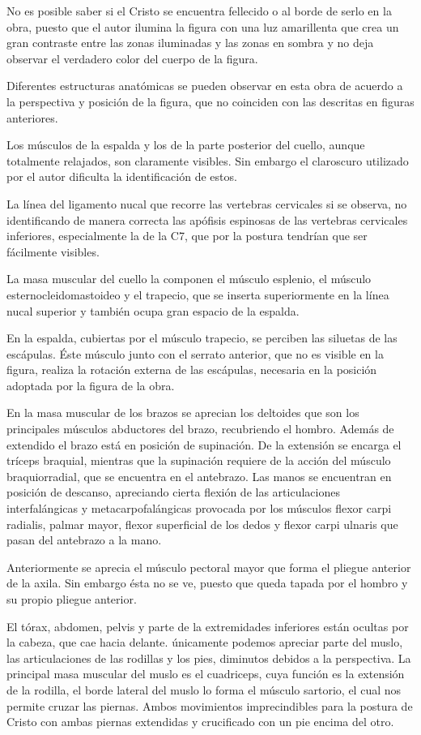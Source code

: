 No es posible saber si el Cristo se encuentra fellecido o al borde de serlo en la obra, puesto que el autor ilumina la figura con una luz amarillenta que crea un gran contraste entre las zonas iluminadas y las zonas en sombra y no deja observar el verdadero color del cuerpo de la figura.

Diferentes estructuras anatómicas se pueden observar en esta obra de acuerdo a la perspectiva y posición de la figura, que no coinciden con las descritas en figuras anteriores.

Los músculos de la espalda y los de la parte posterior del cuello, aunque totalmente relajados, son claramente visibles. Sin embargo el claroscuro utilizado por el autor dificulta la identificación de estos.

La línea del ligamento nucal que recorre las vertebras cervicales si se observa, no identificando de manera correcta las apófisis espinosas de las vertebras cervicales inferiores, especialmente la de la C7, que por la postura tendrían que ser fácilmente visibles. 

La masa muscular del cuello la componen el músculo esplenio, el músculo esternocleidomastoideo y el trapecio, que se inserta superiormente en la línea nucal superior y también ocupa gran espacio de la espalda.

En la espalda, cubiertas por el músculo trapecio, se perciben las siluetas de las escápulas. Éste músculo junto con  el serrato anterior, que no es visible en la figura, realiza la rotación externa de las escápulas, necesaria en la posición adoptada por la figura de la obra.

En la masa muscular de los brazos se aprecian los deltoides que son los principales músculos abductores del brazo, recubriendo el hombro. Además de extendido el brazo está en posición de supinación. De la extensión se encarga el tríceps braquial, mientras que la supinación requiere de la acción del músculo braquiorradial, que se encuentra en el antebrazo. Las manos se encuentran en posición de descanso, apreciando cierta flexión de las articulaciones interfalángicas y metacarpofalángicas provocada por los músculos flexor carpi radialis, palmar mayor, flexor superficial de los dedos y flexor carpi ulnaris que pasan del antebrazo a la mano.

Anteriormente se aprecia el músculo pectoral mayor que forma el pliegue anterior de la axila. Sin embargo ésta no se ve, puesto que queda tapada por el hombro y su propio pliegue anterior.

El tórax, abdomen, pelvis y parte de la extremidades inferiores están ocultas por la cabeza, que cae hacia delante. únicamente podemos apreciar parte del muslo, las articulaciones de las rodillas y los pies, diminutos debidos a la perspectiva. La principal masa muscular del muslo es el cuadriceps, cuya función es la extensión de la rodilla, el borde lateral del muslo lo forma el músculo sartorio, el cual nos permite cruzar las piernas. Ambos movimientos imprecindibles para la postura de Cristo con ambas piernas extendidas y crucificado con un pie encima del otro.

